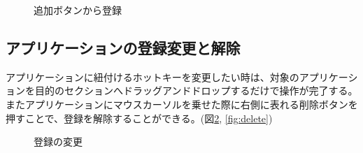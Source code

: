 \begin{figure}[h]
    \begin{center}
    \end{center}
    \caption{追加ボタンから登録}
    \label{fig:add2}
\end{figure}

\subsection{アプリケーションの登録変更と解除}
アプリケーションに紐付けるホットキーを変更したい時は、対象のアプリケーションを目的のセクションへドラッグアンドドロップするだけで操作が完了する。またアプリケーションにマウスカーソルを乗せた際に右側に表れる削除ボタンを押すことで、登録を解除することができる。(図\ref{fig:change}, \ref{fig:delete})

\begin{figure}[h]
    \begin{center}
    \end{center}
    \caption{登録の変更}
    \label{fig:change}
\end{figure}

